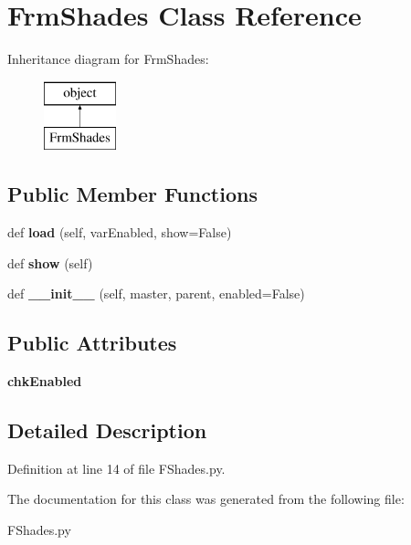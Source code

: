 \hypertarget{class_f_shades_1_1_frm_shades}{}\section{Frm\+Shades Class Reference}
\label{class_f_shades_1_1_frm_shades}
Inheritance diagram for Frm\+Shades\+:\begin{figure}[H]
\begin{center}
\leavevmode
\includegraphics[height=2.000000cm]{class_f_shades_1_1_frm_shades}
\end{center}
\end{figure}
\subsection*{Public Member Functions}
\begin{DoxyCompactItemize}
\item 
\mbox{\label{class_f_shades_1_1_frm_shades_a38f4c0a1b0b9f14e89e7670d417e140a}} 
def {\bfseries load} (self, var\+Enabled, show=False)
\item 
\mbox{\label{class_f_shades_1_1_frm_shades_ab4f4398c3f210fe4ea6e720401357691}} 
def {\bfseries show} (self)
\item 
\mbox{\label{class_f_shades_1_1_frm_shades_adffadd9833af4759460d71b7d00bbf4c}} 
def {\bfseries \+\_\+\+\_\+init\+\_\+\+\_\+} (self, master, parent, enabled=False)
\end{DoxyCompactItemize}
\subsection*{Public Attributes}
\begin{DoxyCompactItemize}
\item 
\mbox{\label{class_f_shades_1_1_frm_shades_aa5ba96b8972782a03e3d83def0f965a9}} 
{\bfseries chk\+Enabled}
\end{DoxyCompactItemize}


\subsection{Detailed Description}


Definition at line 14 of file F\+Shades.\+py.



The documentation for this class was generated from the following file\+:\begin{DoxyCompactItemize}
\item 
F\+Shades.\+py\end{DoxyCompactItemize}
